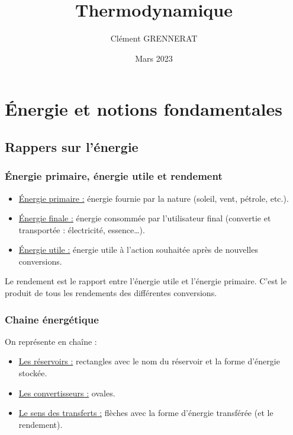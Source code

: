 \documentclass[13pt, twoside, a4paper, french]{report}
\newcommand*{\getSubject}{Thermodynamique}
\begin{document}
\title{\getSubject}
\author{Clément GRENNERAT}
\date{Mars 2023}
\tableofcontents


\chapter{Énergie et notions fondamentales}\label{ch:energie-et-notions-fondamentales-de-thermodynamique}


    \section{Rappers sur l'énergie}\label{sec:rappers-sur-l'energie}

        \subsection{Énergie primaire, énergie utile et rendement}\label{subsec:energie-primaire-energie-utile-et-rendement}

            \begin{itemize}
                \item \underline{Énergie primaire :} énergie fournie par la nature (soleil, vent, pétrole, etc.).
                \item \underline{Énergie finale :} énergie consommée par l'utilisateur final (convertie et transportée : électricité, essence\ldots).
                \item \underline{Énergie utile :} énergie utile à l'action souhaitée après de nouvelles conversions.
            \end{itemize}
            Le rendement est le rapport entre l'énergie utile et l'énergie primaire.
            C'est le produit de tous les rendements des différentes conversions.

        \subsection{Chaine énergétique}\label{subsec:chaine-energetique}

            On représente en chaîne :
            \begin{itemize}
                \item \underline{Les réservoirs :} rectangles avec le nom du réservoir et la forme d'énergie stockée.
                \item \underline{Les convertisseurs :} ovales.
                \item \underline{Le sens des transferts :} flèches avec la forme d'énergie transférée (et le rendement).
            \end{itemize}
\end{document}
